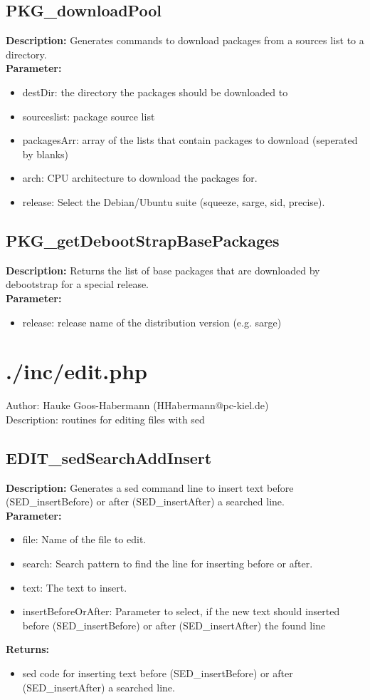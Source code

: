 \subsection{PKG\_downloadPool}
\textbf{Description:} Generates commands to download packages from a sources list to a directory.\\
\textbf{Parameter:}
\begin{itemize}
\item destDir: the directory the packages should be downloaded to
\item sourceslist: package source list
\item packagesArr: array of the lists that contain packages to download (seperated by blanks)
\item arch: CPU architecture to download the packages for.
\item release: Select the Debian/Ubuntu suite (squeeze, sarge, sid, precise).
\end{itemize}

\subsection{PKG\_getDebootStrapBasePackages}
\textbf{Description:} Returns the list of base packages that are downloaded by debootstrap for a special release.\\
\textbf{Parameter:}
\begin{itemize}
\item release: release name of the distribution version (e.g. sarge)
\end{itemize}

\newpage\section{./inc/edit.php}
 Author: Hauke Goos-Habermann (HHabermann@pc-kiel.de)\\
 Description: routines for editing files with sed\\

\subsection{EDIT\_sedSearchAddInsert}
\textbf{Description:} Generates a sed command line to insert text before (SED\_insertBefore) or after (SED\_insertAfter) a searched line.\\
\textbf{Parameter:}
\begin{itemize}
\item file: Name of the file to edit.
\item search: Search pattern to find the line for inserting before or after.
\item text: The text to insert.
\item insertBeforeOrAfter: Parameter to select, if the new text should inserted before (SED\_insertBefore) or after (SED\_insertAfter) the found line
\end{itemize}
\textbf{Returns:}
\begin{itemize}
\item sed code for inserting text before (SED\_insertBefore) or after (SED\_insertAfter) a searched line.
\end{itemize}

